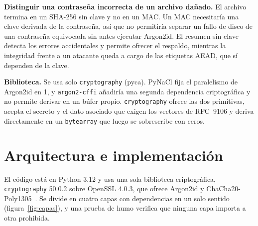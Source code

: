 \documentclass[11pt,letterpaper]{article}
\newcommand{\code}[1]{\texttt{#1}}
\begin{document}
\textbf{Distinguir una contraseña incorrecta de un archivo dañado.} El archivo termina en un SHA-256 sin clave y no en un MAC. Un MAC necesitaría una clave derivada de la contraseña, así que no permitiría separar un fallo de disco de una contraseña equivocada sin antes ejecutar Argon2id. El resumen sin clave detecta los errores accidentales y permite ofrecer el respaldo, mientras la integridad frente a un atacante queda a cargo de las etiquetas AEAD, que sí dependen de la clave.

\textbf{Biblioteca.} Se usa solo \code{cryptography} (pyca). PyNaCl fija el paralelismo de Argon2id en 1, y \code{argon2-cffi} añadiría una segunda dependencia criptográfica y no permite derivar en un búfer propio. \code{cryptography} ofrece las dos primitivas, acepta el secreto y el dato asociado que exigen los vectores de RFC~9106 y deriva directamente en un \code{bytearray} que luego se sobrescribe con ceros.

\section{Arquitectura e implementación}\label{sec:arquitectura}

El código está en Python 3.12 y usa una sola biblioteca criptográfica, \code{cryptography} 50.0.2 sobre OpenSSL 4.0.3, que ofrece Argon2id y ChaCha20-Poly1305~\cite{pyca}. Se divide en cuatro capas con dependencias en un solo sentido (figura~\ref{fig:capas}), y una prueba de humo verifica que ninguna capa importa a otra prohibida.
\end{document}
